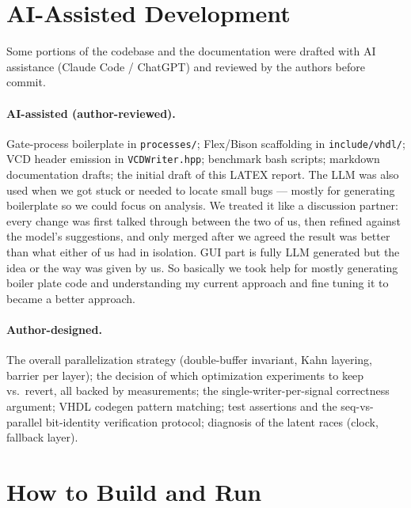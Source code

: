 \documentclass[9pt,a4paper]{article}
\begin{document}
\section{AI-Assisted Development}

Some portions of the codebase and the documentation were drafted with AI assistance (Claude Code / ChatGPT) and reviewed by the authors before commit.

\paragraph{AI-assisted (author-reviewed).} Gate-process boilerplate in \texttt{processes/}; Flex/Bison scaffolding in \texttt{include/vhdl/}; VCD header emission in \texttt{VCDWriter.hpp}; benchmark bash scripts; markdown documentation drafts; the initial draft of this LATEX report. The LLM was also used when we got stuck or needed to locate small bugs — mostly for generating boilerplate so we could focus on analysis. We treated it like a discussion partner: every change was first talked through between the two of us, then refined against the model's suggestions, and only merged after we agreed the result was better than what either of us had in isolation. GUI part is fully LLM generated but the idea or the way was given by us. So basically we took help for mostly generating boiler plate code and understanding my current approach and fine tuning it to became a better approach.  

\paragraph{Author-designed.} The overall parallelization strategy (double-buffer invariant, Kahn layering, barrier per layer); the decision of which optimization experiments to keep vs.\ revert, all backed by measurements; the single-writer-per-signal correctness argument; VHDL codegen pattern matching; test assertions and the seq-vs-parallel bit-identity verification protocol; diagnosis of the latent races (clock, fallback layer).

\section{How to Build and Run}
\end{document}
